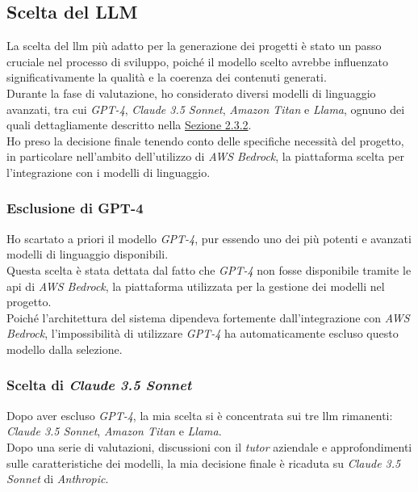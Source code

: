 \subsection{Scelta del LLM}
\label{subsec:scelta-llm}

La scelta del \gls{llm} più adatto per la generazione dei progetti è stato un passo cruciale nel processo di sviluppo, poiché il modello scelto avrebbe influenzato significativamente la qualità e la coerenza dei contenuti generati.\\
Durante la fase di valutazione, ho considerato diversi modelli di linguaggio avanzati, tra cui \textit{GPT-4}, \textit{Claude 3.5 Sonnet}, \textit{Amazon Titan} e \textit{Llama}, ognuno dei quali dettagliamente descritto nella {\hyperref[subsec:llm-confronto]{Sezione 2.3.2}}.\\

\noindent Ho preso la decisione finale tenendo conto delle specifiche necessità del progetto, in particolare nell'ambito dell'utilizzo di \textit{AWS Bedrock}, la piattaforma scelta per l'integrazione con i modelli di linguaggio.

\subsubsection{Esclusione di GPT-4}

Ho scartato a priori il modello \textit{GPT-4}, pur essendo uno dei più potenti e avanzati modelli di linguaggio disponibili.\\
Questa scelta è stata dettata dal fatto che \textit{GPT-4} non fosse disponibile tramite le \gls{api} di \textit{AWS Bedrock}, la piattaforma utilizzata per la gestione dei modelli nel progetto.\\
Poiché l'architettura del sistema dipendeva fortemente dall'integrazione con \textit{AWS Bedrock}, l'impossibilità di utilizzare \textit{GPT-4} ha automaticamente escluso questo modello dalla selezione.

\subsubsection{Scelta di \textit{Claude 3.5 Sonnet}}

Dopo aver escluso \textit{GPT-4}, la mia scelta si è concentrata sui tre \gls{llm} rimanenti: \textit{Claude 3.5 Sonnet}, \textit{Amazon Titan} e \textit{Llama}. \\
Dopo una serie di valutazioni, discussioni con il \textit{tutor} aziendale e approfondimenti sulle caratteristiche dei modelli, la mia decisione finale è ricaduta su \textit{Claude 3.5 Sonnet} di \textit{Anthropic}.\\

